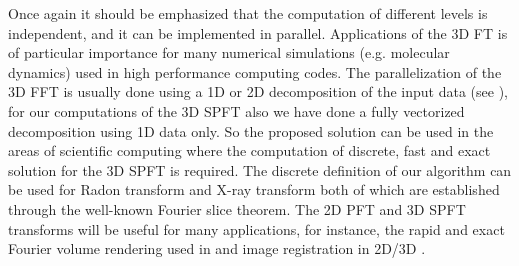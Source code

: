 \documentclass{UCF_ETD}
\begin{document}
 Once again it should be emphasized that the computation of different levels is independent, and it can be implemented in parallel. Applications of the 3D FT is of particular importance for many numerical simulations (e.g. molecular dynamics) used in high performance computing codes. The parallelization of the 3D FFT is usually done using a 1D or 2D decomposition of the input data (see \cite{Ayala2013}), for our computations of the 3D SPFT also we have done a fully vectorized decomposition using 1D data only. So the proposed solution can be used in the areas of scientific computing where the computation of discrete, fast and exact solution for the 3D SPFT is required. The discrete definition of our algorithm can be used for Radon transform and X-ray transform both of which are established through
  the well-known Fourier slice theorem. The 2D PFT and 3D SPFT transforms will be useful for many applications, for instance, the rapid and exact Fourier volume rendering used in \cite{Lichtenbelt1995} and image registration in 2D/3D \cite{Alam2015}.
 
 
 
 
\end{document}
